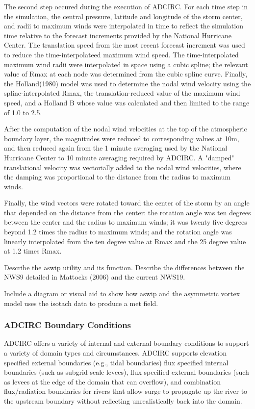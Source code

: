 \documentclass[12pt]{article}
\begin{document}
The second step occured during the execution of ADCIRC. For each 
time step in the simulation, the central pressure, latitude and 
longitude of the storm center, and radii to maximum winds were 
interpolated in time to reflect the simulation time relative to the 
forecast increments provided by the National Hurricane Center. The 
translation speed from the most recent forecast increment was used 
to reduce the time-interpolateed maximum wind speed. The 
time-interpolated maximum wind radii were interpolated in space 
using a cubic spline; the relevant value of Rmax at each node was 
determined from the cubic spline curve. Finally, the Holland(1980) 
model was used to determine the nodal wind velocity using the 
spline-interpolated Rmax, the translation-reduced value of the 
maximum wind speed, and a Holland B whose value was calculated and 
then limited to the range of 1.0 to 2.5.

After the computation of the nodal wind velocities at the top of the 
atmospheric boundary layer, the magnitudes were reduced to 
corresponding values at 10m, and then reduced again from the 1 
minute averaging used by the National Hurricane Center to 10 minute 
averaging required by ADCIRC. A "damped" translational velocity was 
vectorially added to the nodal wind velocities, where the damping 
was proportional to the distance from the radius to maximum winds.

Finally, the wind vectors were rotated toward the center of the 
storm by an angle that depended on the distance from the center: the 
rotation angle was ten degrees between the center and the radius to 
maximum winds; it was twenty five degrees beyond 1.2 times the 
radius to maximum winds; and the rotation angle was linearly 
interpolated from the ten degree value at Rmax and the 25 degree 
value at 1.2 times Rmax.

Describe the aswip utility and its function. Describe the 
differences between the NWS9 detailed in Mattocks (2006) and the 
current NWS19. 

Include a diagram or visual aid to show how aswip and the asymmetric 
vortex model uses the isotach data to produce a met field. 

\subsubsection{ADCIRC Boundary Conditions}

ADCIRC offers a variety of internal and external boundary conditions 
to support a variety of domain types and circumstances. ADCIRC 
supports elevation specified external boundaries (e.g., tidal 
boundaries) flux specified internal boundaries (such as subgrid 
scale levees), flux specified external boundaries (such as levees at 
the edge of the domain that can overflow), and combination 
flux/radiation boundaries for rivers that allow surge to propagate 
up the river to the upstream boundary without reflecting 
unrealistically back into the domain.
\end{document}
